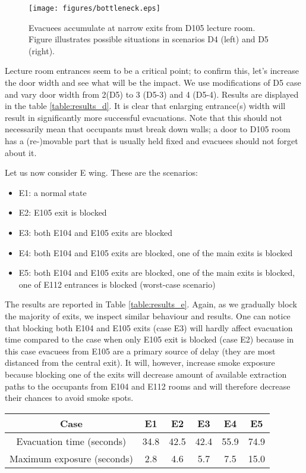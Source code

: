 \begin{figure}
    \centering
    \texttt{[image: figures/bottleneck.eps]}
    \caption{
        Evacuees accumulate at narrow exits from D105 lecture room.
        Figure illustrates possible situations in scenarios D4 (left) and
        D5 (right).
    }
    \label{fig:bottleneck}
\end{figure}

Lecture room entrances seem to be a critical point; to confirm this, let's
increase the door width and see what will be the impact.
We use modifications of D5 case and vary door width from 2(D5) to 3 (D5-3)
and 4 (D5-4).
Results are displayed in the table \ref{table:results_d}.
It is clear that enlarging entrance(s) width will result in significantly more
successful evacuations.
Note that this should not necessarily mean that occupants must break down walls;
a door to D105 room has a (re-)movable part that is usually held fixed and
evacuees should not forget about it.

Let us now consider E wing. These are the scenarios:
\begin{itemize}
    \item E1: a normal state
    \item E2: E105 exit is blocked
    \item E3: both E104 and E105 exits are blocked
    \item E4: both E104 and E105 exits are blocked, one of the main exits is
    blocked
    \item E5: both E104 and E105 exits are blocked, one of the main exits is
    blocked, one of E112 entrances is blocked (worst-case scenario)
\end{itemize}

The results are reported in Table \ref{table:results_e}.
Again, as we gradually block the majority of exits, we inspect similar behaviour
and results.
One can notice that blocking both E104 and E105 exits (case E3) will hardly
affect evacuation time compared to the case when only E105 exit is blocked
(case E2) because in this case evacuees from E105 are a primary source of
delay (they are most distanced from the central exit).
It will, however, increase smoke exposure because blocking one of the exits
will decrease amount of available extraction paths to the occupants
from E104 and E112 rooms and will therefore decrease their chances to avoid
smoke spots.

\begin{center}
    \label{table:results_e}
    \begin{tabular}{ c | c | c | c | c | c }
        \hline
        Case & E1 & E2 & E3 & E4 & E5 \\
        \hline
        Evacuation time (seconds) & 34.8 & 42.5 & 42.4 & 55.9 & 74.9 \\
        Maximum exposure (seconds) & 2.8 & 4.6 & 5.7 & 7.5 & 15.0 \\
        \hline
    \end{tabular}
\end{center}


